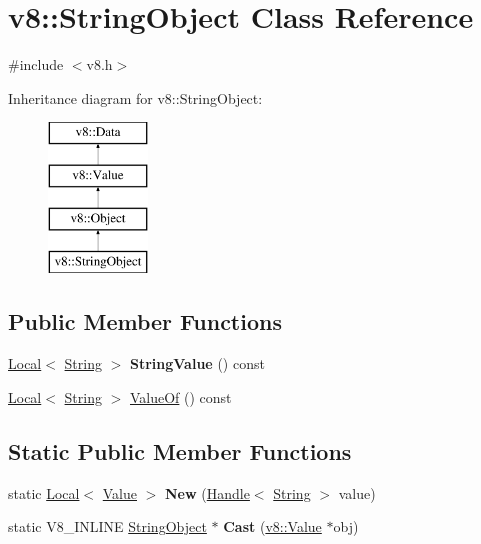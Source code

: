 \hypertarget{classv8_1_1_string_object}{}\section{v8\+:\+:String\+Object Class Reference}
\label{classv8_1_1_string_object}


{\ttfamily \#include $<$v8.\+h$>$}

Inheritance diagram for v8\+:\+:String\+Object\+:\begin{figure}[H]
\begin{center}
\leavevmode
\includegraphics[height=4.000000cm]{classv8_1_1_string_object}
\end{center}
\end{figure}
\subsection*{Public Member Functions}
\begin{DoxyCompactItemize}
\item 
\hypertarget{classv8_1_1_string_object_a7fc2bf2ec12bedb44dc735988508ab94}{}\hyperlink{classv8_1_1_local}{Local}$<$ \hyperlink{classv8_1_1_string}{String} $>$ {\bfseries String\+Value} () const \label{classv8_1_1_string_object_a7fc2bf2ec12bedb44dc735988508ab94}

\item 
\hyperlink{classv8_1_1_local}{Local}$<$ \hyperlink{classv8_1_1_string}{String} $>$ \hyperlink{classv8_1_1_string_object_a96bd6c736a0272ab7e683038953077e4}{Value\+Of} () const 
\end{DoxyCompactItemize}
\subsection*{Static Public Member Functions}
\begin{DoxyCompactItemize}
\item 
\hypertarget{classv8_1_1_string_object_a299c1d30b32e8bc336c8af05471a0763}{}static \hyperlink{classv8_1_1_local}{Local}$<$ \hyperlink{classv8_1_1_value}{Value} $>$ {\bfseries New} (\hyperlink{classv8_1_1_handle}{Handle}$<$ \hyperlink{classv8_1_1_string}{String} $>$ value)\label{classv8_1_1_string_object_a299c1d30b32e8bc336c8af05471a0763}

\item 
\hypertarget{classv8_1_1_string_object_af2169f0b4c890196416e4d28fbf76df8}{}static V8\+\_\+\+I\+N\+L\+I\+N\+E \hyperlink{classv8_1_1_string_object}{String\+Object} $\ast$ {\bfseries Cast} (\hyperlink{classv8_1_1_value}{v8\+::\+Value} $\ast$obj)\label{classv8_1_1_string_object_af2169f0b4c890196416e4d28fbf76df8}

\end{DoxyCompactItemize}


